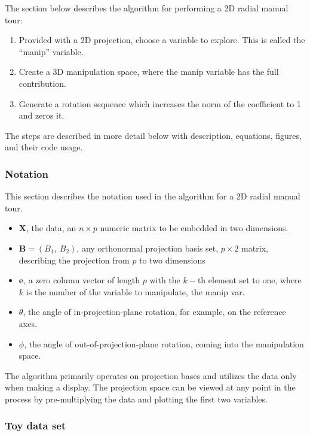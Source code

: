 The section below describes the algorithm for performing a 2D radial
manual tour:

\begin{enumerate}
\def\labelenumi{\arabic{enumi}.}
\tightlist
\item
  Provided with a 2D projection, choose a variable to explore. This is
  called the ``manip'' variable.
\item
  Create a 3D manipulation space, where the manip variable has the full
  contribution.
\item
  Generate a rotation sequence which increases the norm of the
  coefficient to 1 and zeros it.
\end{enumerate}

The steps are described in more detail below with description,
equations, figures, and their code usage.

\hypertarget{notation}{%
\subsubsection{Notation}\label{notation}}

This section describes the notation used in the algorithm for a 2D
radial manual tour.

\begin{itemize}
  \item $\textbf{X}$, the data, an $n \times p$ numeric matrix to be embedded in two dimensions.
  \item $\textbf{B} = (B_1,~ B_2)$, any orthonormal projection basis set, $p \times 2$ matrix, describing the projection from $p$ to two dimensions
  \item $\textbf{e}$, a zero column vector of length $p$ with the $k-$th element set to one, where $k$ is the number of the variable to manipulate, the manip var.
  \item $\theta$, the angle of in-projection-plane rotation, for example, on the reference axes.
  \item $\phi$, the angle of out-of-projection-plane rotation, coming into the manipulation space.
\end{itemize}

The algorithm primarily operates on projection bases and utilizes the
data only when making a display. The projection space can be viewed at
any point in the process by pre-multiplying the data and plotting the
first two variables.

\hypertarget{toy-data-set}{%
\subsubsection{Toy data set}\label{toy-data-set}}

